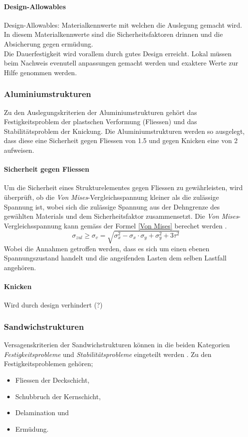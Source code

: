 \paragraph{Design-Allowables}
Design-Allowables: Materialkennwerte mit welchen die Auslegung gemacht wird.\\
In diesem Materialkennwerte sind die Sicherheitsfaktoren drinnen und die Absicherung gegen ermüdung.\\

Die Dauerfestigkeit wird vorallem durch gutes Design erreicht. Lokal müssen beim Nachweis evenutell anpassungen gemacht werden und exaktere Werte zur Hilfe genommen werden.

  \subsubsection{Aluminiumstrukturen}
  Zu den Auslegungskriterien der Aluminiumstrukturen gehört das Festigkeitsproblem der plastschen Verformung (Fliessen) und das Stabilitätsproblem der Knickung. Die Aluminiumstrukturen werden so ausgelegt, dass diese eine Sicherheit gegen Fliessen von 1.5 und gegen Knicken eine von 2 aufweisen.

  \paragraph{Sicherheit gegen Fliessen}
  Um die Sicherheit eines Strukturelementes gegen Fliessen zu gewährleisten, wird überprüft, ob die \emph{Von Mises}-Vergleichsspannung kleiner als die zulässige Spannung ist, wobei sich die zulässige Spannung aus der Dehngrenze des gewählten Materials und dem Sicherheitsfaktor zusammensetzt. Die \emph{Von Mises}-Vergleichsspannung kann gemäss der Formel \ref{Von Mises} berechet werden \cite{Baertsch}.
  \begin{equation}
    \label{Von Mises}
    \sigma_{zul} \geq \sigma_v = \sqrt{\sigma_x^{2}-\sigma_x \cdot \sigma_y + \sigma_y^2 + 3\tau^2}
  \end{equation}
  Wobei die Annahmen getroffen werden, dass es sich um einen ebenen Spannungszustand handelt und die angeifenden Lasten dem selben Lastfall angehören.

  \paragraph{Knicken}
  Wird durch design verhindert (?)

  \subsubsection{Sandwichstrukturen}
  Versagenskriterien der Sandwichstrukturen können in die beiden Kategorien \emph{Festigkeitsprobleme} und \emph{Stabilitätsprobleme} eingeteilt werden \cite{ETH}. Zu den Festigkeitsproblemen gehören;
  \begin{itemize}
    \item Fliessen der Deckschicht,
    \item Schubbruch der Kernschicht,
    \item Delamination und
    \item Ermüdung.
  \end{itemize}

